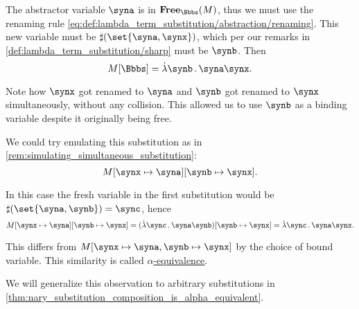 \begin{example}
\begin{thmenum}
    The abstractor variable \( \syna \) is in \( \op*{Free}_\Bbbs(M) \), thus we must use the renaming rule \eqref{eq:def:lambda_term_substitution/abstraction/renaming}. This new variable must be \( \sharp(\set{ \syna, \synx }) \), which per our remarks in \cref{def:lambda_term_substitution/sharp} must be \( \synb \). Then
    \begin{equation*}
      M[\Bbbs] = \qabs \synb \syna \synx.
    \end{equation*}

    Note how \( \synx \) got renamed to \( \syna \) and \( \synb \) got renamed to \( \synx \) simultaneously, without any collision. This allowed us to use \( \synb \) as a binding variable despite it originally being free.

    We could try emulating this substitution as in \cref{rem:simulating_simultaneous_substitution}:
    \begin{equation*}
      M[\synx \mapsto \syna][\synb \mapsto \synx].
    \end{equation*}

    In this case the fresh variable in the first substitution would be \( \sharp(\set{ \syna, \synb }) = \sync \), hence
    \begin{equation*}
      M[\synx \mapsto \syna][\synb \mapsto \synx]
      =
      (\qabs \sync \syna \synb)[\synb \mapsto \synx]
      =
      \qabs \sync \syna \synx.
    \end{equation*}

    This differs from \( M[\synx \mapsto \syna, \synb \mapsto \synx] \) by the choice of bound variable. This similarity is called \hyperref[def:lambda_term_alpha_equivalence]{\( \alpha \)-equivalence}.

    We will generalize this observation to arbitrary substitutions in \cref{thm:nary_substitution_composition_is_alpha_equivalent}.
  \end{thmenum}
\end{example}
